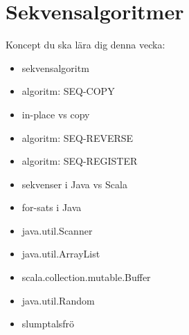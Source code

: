 \chapter{Sekvensalgoritmer}\label{chapter:W05}
Koncept du ska lära dig denna vecka:
\begin{multicols}{2}\begin{itemize}[nosep,label={$\square$},leftmargin=*]
\item sekvensalgoritm
\item algoritm: SEQ-COPY
\item in-place vs copy
\item algoritm: SEQ-REVERSE
\item algoritm: SEQ-REGISTER
\item sekvenser i Java vs Scala
\item for-sats i Java
\item java.util.Scanner
\item java.util.ArrayList
\item scala.collection.mutable.Buffer
\item java.util.Random
\item slumptalsfrö\end{itemize}\end{multicols}
